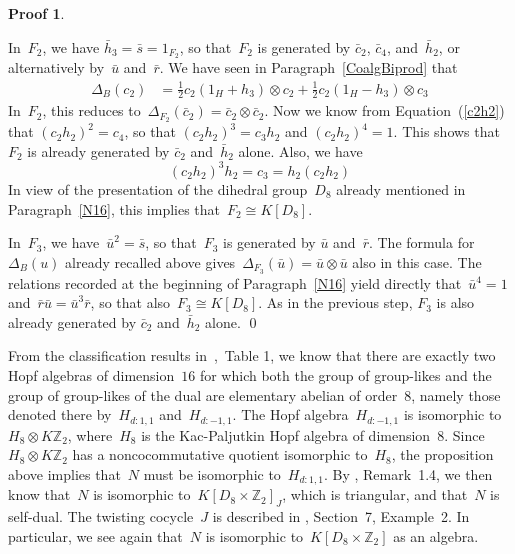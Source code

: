 \documentclass{article}
\newcounter{num}
\newenvironment{pflist}{\begin{list}{(\arabic{num})}{\usecounter{num} \leftmargin0cm \itemindent5pt}}{\end{list}}
\newcounter{num1}
\numberwithin{equation}{section}
\theoremstyle{definition}
\newtheorem*{pf}{Proof}
\theoremstyle{break}
\newcommand{\ot}{\mathbin{\otimes}}
\newcommand{\1}{{(1)}}
\newcommand{\2}{{(2)}}
\newcommand{\3}{{(3)}}
\newcommand{\db}{\Delta_{B}}
\newcommand{\Z}{{\mathbb Z}}
\newcommand{\HH}{1_H}
\begin{document}
\begin{pf}
\begin{pflist}
\item
In~$F_2$, we have $\bar{h}_3 = \bar{s} = 1_{F_2}$, so that~$F_2$ is generated by $\bar{c}_2$, $\bar{c}_4$, and~$\bar{h}_2$, or alternatively by~$\bar{u}$ and~$\bar{r}$.
We have seen in Paragraph~\ref{CoalgBiprod} that
\begin{align*}
\db(c_2) &= \frac{1}{2} c_2(\HH + h_3) \ot c_2 + \frac{1}{2} c_2 (\HH - h_3) \ot c_3
\end{align*}
In~$F_2$, this reduces to~$\Delta_{F_2}(\bar{c}_2) = \bar{c}_2 \ot \bar{c}_2$. Now we know from Equation~(\ref{c2h2}) that $(c_2 h_2)^2 = c_4$, so that $(c_2 h_2)^3 = c_3 h_2$ and $(c_2 h_2)^4 = 1$. This shows that~$F_2$ is already generated by $\bar{c}_2$ and~$\bar{h}_2$ alone. Also, we have
\[(c_2 h_2)^3 h_2 = c_3 = h_2 (c_2 h_2)\]
In view of the presentation of the dihedral group~$D_8$ already mentioned in Paragraph~\ref{N16}, this implies that~$F_2 \cong K[D_8]$.

\item
In~$F_3$, we have~\mbox{$\bar{u}^2 = \bar{s}$}, so that~$F_3$ is generated by $\bar{u}$ and~$\bar{r}$. The formula for~$\db(u)$ already recalled above gives~$\Delta_{F_3}(\bar{u}) = \bar{u} \ot \bar{u}$ also in this case. The relations recorded at the beginning of Paragraph~\ref{N16} yield directly that~\mbox{$\bar{u}^4 = 1$}
and~$\bar{r} \bar{u} = \bar{u}^3 \bar{r}$, so that also~$F_3 \cong K[D_8]$. As in the previous step, $F_3$ is also already generated by $\bar{c}_2$ and~$\bar{h}_2$ alone.
\qed
\end{pflist}
\end{pf}

From the classification results in~\cite{Ka},~Table 1, we know that there are exactly two Hopf algebras of dimension~$16$ for which both the group of group-likes and the group of group-likes of the dual are elementary abelian of order~$8$, namely those denoted there by~$H_{d:1,1}$
and~$H_{d:-1, 1}$. The Hopf algebra~$H_{d:-1, 1}$ is isomorphic
to~\mbox{$H_8 \ot K\Z_2$}, where~$H_8$ is the Kac-Paljutkin Hopf algebra of dimension~$8$. Since~$H_8 \ot K\Z_2$ has a noncocommutative quotient isomorphic to~$H_8$, the proposition above implies that~$N$ must be isomorphic to~$H_{d:1,1}$. By \cite{Ka}, Remark~1.4, we then know that~$N$ is isomorphic to~$K [D_8 \times \Z_2]_J$, which is triangular, and that~$N$ is self-dual. The twisting cocycle~$J$ is described in \cite{Ka}, Section~7, Example~2. In particular, we see again that~$N$ is isomorphic to~$K [D_8 \times \Z_2]$ as an algebra.
\end{document}
